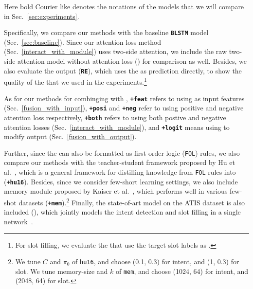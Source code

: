 Here bold Courier like \textbf{\BLSTM} denotes the notations of the models that we will compare in Sec.~\ref{sec:experiments}.

Specifically, we compare our methods with the baseline \textbf{\texttt{BLSTM}} model (Sec.~\ref{sec:baseline}).
Since our attention loss method (Sec.~\ref{interact_with_module}) uses two-side attention, we include the raw two-side attention model without attention loss (\textbf{\ptatt}) for comparison as well.
Besides, we also evaluate the \RE output (\textbf{\texttt{RE}}), which uses the \REtags as prediction directly, to show the quality of the \REs that we used in the experiments.\footnote{
	For slot filling, we evaluate the \REs that use the target slot labels as \REtags.}

As for our methods for combinging \REs with \NN,
\textbf{\texttt{+feat}}  refers to using \REtag as input features (Sec.~\ref{fusion_with_input}),
\textbf{\texttt{+posi}} and \textbf{\texttt{+neg}} refer to using positive and negative attention loss respectively,
\textbf{\texttt{+both}} refers to using both postive and negative attention losses (Sec.~\ref{interact_with_module}),
and \textbf{\texttt{+logit}} means using \REtag to modify \NN output (Sec.~\ref{fusion_with_output}).

Further, since the \REs can also be formatted as first-order-logic (\texttt{FOL}) rules, we also compare our methods with the teacher-student framework proposed by Hu et al.~, which is a general framework for distilling knowledge from \texttt{FOL} rules into \NN (\textbf{\texttt{+hu16}}). 
Besides, since we consider few-short learning settings,  we also include memory module proposed by Kaiser et al.~, which performs well in various few-shot datasets (\textbf{\texttt{+mem}}).\footnote{
	We tune $C$ and $\pi_0$ of \texttt{hu16}, and choose (0.1, 0.3) for intent, and (1, 0.3) for slot. We tune memory-size and $k$ of \texttt{mem}, and choose (1024, 64) for intent, and (2048, 64) for slot.
}
Finally, the state-of-art model on the ATIS dataset is also included (\textbf{\LL}), which jointly models the intent detection and slot filling in a single network~\cite{liu2016attention}.


